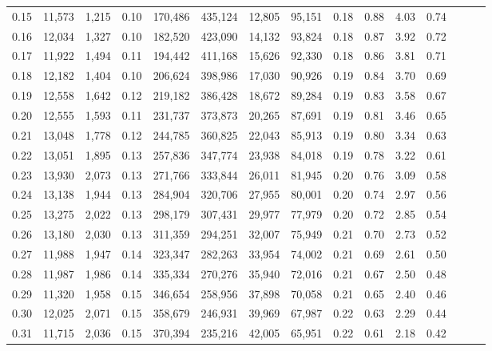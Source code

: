 \begin{tabular}{rrrrrrrrrrrrrrr}
0.15 &  11,573 &  1,215 &  0.10 &  170,486 &  435,124 &   12,805 &   95,151 &  0.18 &  0.88 &  4.03 &      0.74 \\
0.16 &  12,034 &  1,327 &  0.10 &  182,520 &  423,090 &   14,132 &   93,824 &  0.18 &  0.87 &  3.92 &      0.72 \\
0.17 &  11,922 &  1,494 &  0.11 &  194,442 &  411,168 &   15,626 &   92,330 &  0.18 &  0.86 &  3.81 &      0.71 \\
0.18 &  12,182 &  1,404 &  0.10 &  206,624 &  398,986 &   17,030 &   90,926 &  0.19 &  0.84 &  3.70 &      0.69 \\
0.19 &  12,558 &  1,642 &  0.12 &  219,182 &  386,428 &   18,672 &   89,284 &  0.19 &  0.83 &  3.58 &      0.67 \\
0.20 &  12,555 &  1,593 &  0.11 &  231,737 &  373,873 &   20,265 &   87,691 &  0.19 &  0.81 &  3.46 &      0.65 \\
0.21 &  13,048 &  1,778 &  0.12 &  244,785 &  360,825 &   22,043 &   85,913 &  0.19 &  0.80 &  3.34 &      0.63 \\
0.22 &  13,051 &  1,895 &  0.13 &  257,836 &  347,774 &   23,938 &   84,018 &  0.19 &  0.78 &  3.22 &      0.61 \\
0.23 &  13,930 &  2,073 &  0.13 &  271,766 &  333,844 &   26,011 &   81,945 &  0.20 &  0.76 &  3.09 &      0.58 \\
0.24 &  13,138 &  1,944 &  0.13 &  284,904 &  320,706 &   27,955 &   80,001 &  0.20 &  0.74 &  2.97 &      0.56 \\
0.25 &  13,275 &  2,022 &  0.13 &  298,179 &  307,431 &   29,977 &   77,979 &  0.20 &  0.72 &  2.85 &      0.54 \\
0.26 &  13,180 &  2,030 &  0.13 &  311,359 &  294,251 &   32,007 &   75,949 &  0.21 &  0.70 &  2.73 &      0.52 \\
0.27 &  11,988 &  1,947 &  0.14 &  323,347 &  282,263 &   33,954 &   74,002 &  0.21 &  0.69 &  2.61 &      0.50 \\
0.28 &  11,987 &  1,986 &  0.14 &  335,334 &  270,276 &   35,940 &   72,016 &  0.21 &  0.67 &  2.50 &      0.48 \\
0.29 &  11,320 &  1,958 &  0.15 &  346,654 &  258,956 &   37,898 &   70,058 &  0.21 &  0.65 &  2.40 &      0.46 \\
0.30 &  12,025 &  2,071 &  0.15 &  358,679 &  246,931 &   39,969 &   67,987 &  0.22 &  0.63 &  2.29 &      0.44 \\
0.31 &  11,715 &  2,036 &  0.15 &  370,394 &  235,216 &   42,005 &   65,951 &  0.22 &  0.61 &  2.18 &      0.42 \\

\end{tabular}

